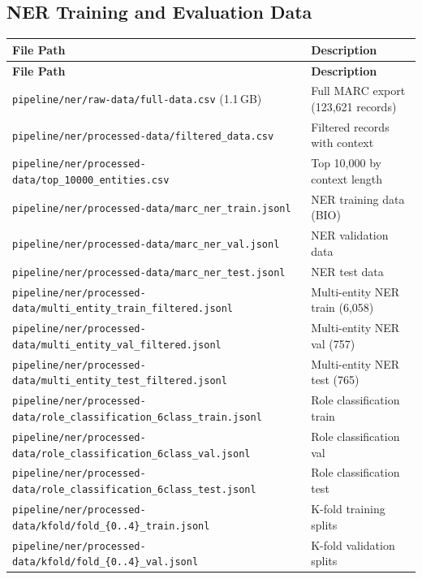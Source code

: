 \documentclass[12pt]{article}
\newcommand{\filepath}[1]{\texttt{\small #1}}
\begin{document}
\subsection{NER Training and Evaluation Data}

\begin{longtable}{|p{9cm}|p{4cm}|}
\hline
\textbf{File Path} & \textbf{Description} \\
\hline
\endfirsthead
\hline
\textbf{File Path} & \textbf{Description} \\
\hline
\endhead
\hline
\endfoot
\filepath{pipeline/ner/raw-data/full-data.csv} (1.1\,GB) & Full MARC export (123,621 records) \\
\hline
\filepath{pipeline/ner/processed-data/filtered\_data.csv} & Filtered records with context \\
\hline
\filepath{pipeline/ner/processed-data/top\_10000\_entities.csv} & Top 10,000 by context length \\
\hline
\filepath{pipeline/ner/processed-data/marc\_ner\_train.jsonl} & NER training data (BIO) \\
\hline
\filepath{pipeline/ner/processed-data/marc\_ner\_val.jsonl} & NER validation data \\
\hline
\filepath{pipeline/ner/processed-data/marc\_ner\_test.jsonl} & NER test data \\
\hline
\filepath{pipeline/ner/processed-data/multi\_entity\_train\_filtered.jsonl} & Multi-entity NER train (6,058) \\
\hline
\filepath{pipeline/ner/processed-data/multi\_entity\_val\_filtered.jsonl} & Multi-entity NER val (757) \\
\hline
\filepath{pipeline/ner/processed-data/multi\_entity\_test\_filtered.jsonl} & Multi-entity NER test (765) \\
\hline
\filepath{pipeline/ner/processed-data/role\_classification\_6class\_train.jsonl} & Role classification train \\
\hline
\filepath{pipeline/ner/processed-data/role\_classification\_6class\_val.jsonl} & Role classification val \\
\hline
\filepath{pipeline/ner/processed-data/role\_classification\_6class\_test.jsonl} & Role classification test \\
\hline
\filepath{pipeline/ner/processed-data/kfold/fold\_\{0..4\}\_train.jsonl} & K-fold training splits \\
\hline
\filepath{pipeline/ner/processed-data/kfold/fold\_\{0..4\}\_val.jsonl} & K-fold validation splits \\

\end{longtable}
\end{document}
